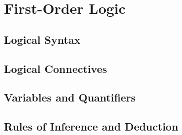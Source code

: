 \documentclass[../../../main/main.tex]{subfiles}
\begin{document}
\chapter{First-Order Logic}

\section{Logical Syntax}

\section{Logical Connectives}

\section{Variables and Quantifiers}

\section{Rules of Inference and Deduction}
\end{document}
